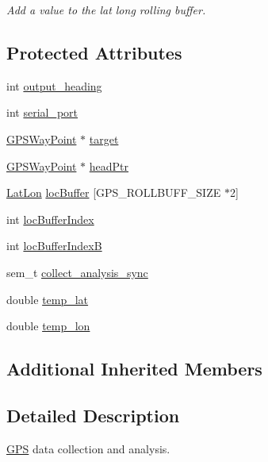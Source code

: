 \begin{DoxyCompactItemize}
\begin{DoxyCompactList}\small\item\em Add a value to the lat long rolling buffer. \end{DoxyCompactList}\end{DoxyCompactItemize}
\subsection*{Protected Attributes}
\begin{DoxyCompactItemize}
\item 
int \hyperlink{classGPS_a14c36e0dcc27dfa5e1381b9a4b25c2ce}{output\-\_\-heading}
\item 
int \hyperlink{classGPS_a62ebacee895a13c211bfd372b818b680}{serial\-\_\-port}
\item 
\hyperlink{classGPS_1_1GPSWayPoint}{G\-P\-S\-Way\-Point} $\ast$ \hyperlink{classGPS_a9deda2a96578019d9512a8ec74a93191}{target}
\item 
\hyperlink{classGPS_1_1GPSWayPoint}{G\-P\-S\-Way\-Point} $\ast$ \hyperlink{classGPS_ad1fea42571de73f9b9278cc329490457}{head\-Ptr}
\item 
\hyperlink{classGPS_1_1LatLon}{Lat\-Lon} \hyperlink{classGPS_a78bd0e171c43d44a60349cba2d05f29b}{loc\-Buffer} \mbox{[}G\-P\-S\-\_\-\-R\-O\-L\-L\-B\-U\-F\-F\-\_\-\-S\-I\-Z\-E $\ast$2\mbox{]}
\item 
int \hyperlink{classGPS_a8a593af52417cf88df7c6c7172d7caf7}{loc\-Buffer\-Index}
\item 
int \hyperlink{classGPS_ac85c17369384b4f9ddb0d0358df9d1cf}{loc\-Buffer\-Index\-B}
\item 
sem\-\_\-t \hyperlink{classGPS_ab0d29060e79b34b84fa06847a36de2e7}{collect\-\_\-analysis\-\_\-sync}
\item 
double \hyperlink{classGPS_aa0e370ef448d131c54e3b1d626576cd2}{temp\-\_\-lat}
\item 
double \hyperlink{classGPS_a4b108cba87ab121532c180e214d0c7fa}{temp\-\_\-lon}
\end{DoxyCompactItemize}
\subsection*{Additional Inherited Members}


\subsection{Detailed Description}
\hyperlink{classGPS}{G\-P\-S} data collection and analysis. 

